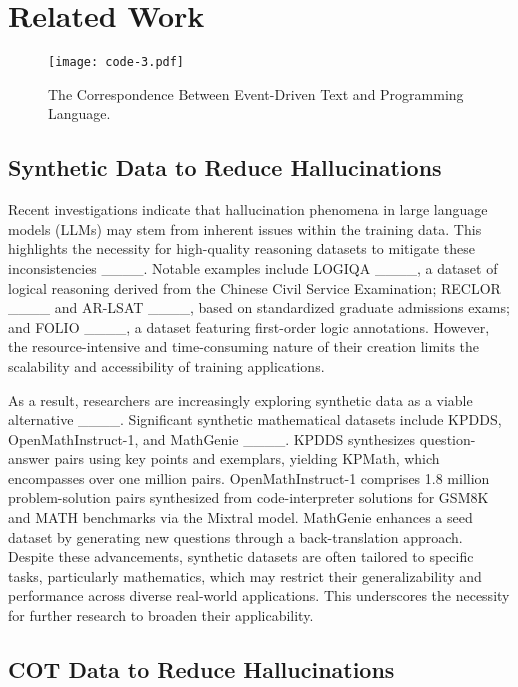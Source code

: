 \section{Related Work}
\begin{figure}[t]
    \texttt{[image: code-3.pdf]}
    \centering
    \caption{The Correspondence Between Event-Driven 
Text and Programming Language.}
    \label{fig:compare}
    \end{figure}


\subsection{Synthetic Data to Reduce Hallucinations}

Recent investigations indicate that hallucination phenomena in large language models (LLMs) may stem from inherent issues within the training data. This highlights the necessity for high-quality reasoning datasets to mitigate these inconsistencies ____. Notable examples include LOGIQA ____, a dataset of logical reasoning derived from the Chinese Civil Service Examination; RECLOR ____ and AR-LSAT ____, based on standardized graduate admissions exams; and FOLIO ____, a dataset featuring first-order logic annotations. However, the resource-intensive and time-consuming nature of their creation limits the scalability and accessibility of training applications.

As a result, researchers are increasingly exploring synthetic data as a viable alternative ____. Significant synthetic mathematical datasets include KPDDS, OpenMathInstruct-1, and MathGenie ____. KPDDS synthesizes question-answer pairs using key points and exemplars, yielding KPMath, which encompasses over one million pairs. OpenMathInstruct-1 comprises 1.8 million problem-solution pairs synthesized from code-interpreter solutions for GSM8K and MATH benchmarks via the Mixtral model. MathGenie enhances a seed dataset by generating new questions through a back-translation approach. Despite these advancements, synthetic datasets are often tailored to specific tasks, particularly mathematics, which may restrict their generalizability and performance across diverse real-world applications. This underscores the necessity for further research to broaden their applicability.

    
\subsection{COT Data to Reduce Hallucinations}


